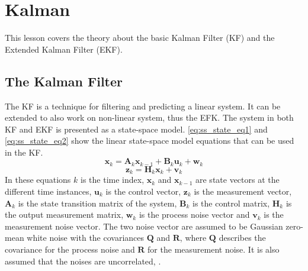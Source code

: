 \documentclass[Main]{subfiles}
\begin{document}
\section{Kalman} %
	\label{sec:kalman}
This lesson covers the theory about the basic Kalman Filter (KF) and the Extended Kalman Filter (EKF).
\subsection{The Kalman Filter}
The KF is a technique for filtering and predicting a linear system. 
It can be extended to also work on non-linear system, thus the EFK. 
The system in both KF and EKF is presented as a state-space model.
\autoref{eq:ss_state_eq1} and \autoref{eq:ss_state_eq2} show the linear state-space model equations that can be used in the KF.
\begin{equation}
\label{eq:ss_state_eq1}
\mathbf{x}_k = \mathbf{A}_k \mathbf{x}_{k-1} + \mathbf{B}_k \mathbf{u}_k + \mathbf{w}_k
\end{equation}
\begin{equation}
\label{eq:ss_state_eq2}
\mathbf{z}_k = \mathbf{H}_k \mathbf{x}_k + \mathbf{v}_k
\end{equation}
In these equations $k$ is the time index, $\mathbf{x}_k$ and $\mathbf{x}_{k-1}$ are state vectors at the different time instances, $\mathbf{u}_k$ is the control vector, $\mathbf{z}_k$ is the measurement vector, $\mathbf{A}_k$ is the state transition matrix of the system, $\mathbf{B}_k$ is the control matrix, $\mathbf{H}_k$ is the output measurement matrix, $\mathbf{w}_k$ is the process noise vector and $\mathbf{v}_k$ is the measurement noise vector.
The two noise vector are assumed to be Gaussian zero-mean white noise with the covariances $\mathbf{Q}$ and $\mathbf{R}$, where $\mathbf{Q}$ describes the covariance for the process noise and $\mathbf{R}$ for the measurement noise. 
It is also assumed that the noises are uncorrelated, \citep{Simon2006}.
\end{document}
